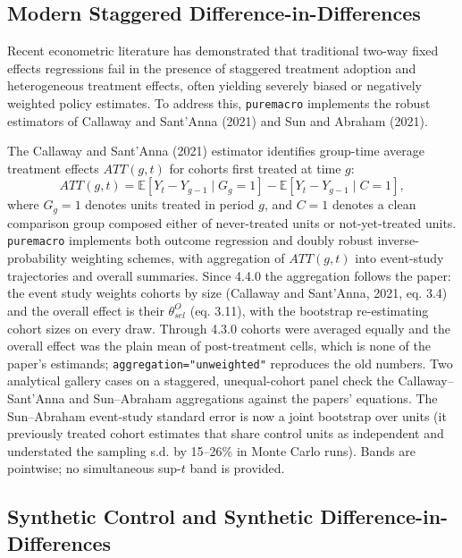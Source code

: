 \documentclass[11pt,letterpaper]{article}
\newcounter{none} %
\renewcommand{\_}{\pmunderscore\allowbreak}
\begin{document}
\subsection{Modern Staggered Difference-in-Differences}\label{modern-staggered-difference-in-differences}

Recent econometric literature has demonstrated that traditional two-way fixed effects regressions fail in the presence of staggered treatment adoption and heterogeneous treatment effects, often yielding severely biased or negatively weighted policy estimates. To address this, \texttt{puremacro} implements the robust estimators of Callaway and Sant'Anna (2021) and Sun and Abraham (2021).

The Callaway and Sant'Anna (2021) estimator identifies group-time average treatment effects \(ATT(g, t)\) for cohorts first treated at time \(g\):
\[ATT(g, t) = \mathbb{E}\left[ Y_t - Y_{g-1} \mid G_g = 1 \right] - \mathbb{E}\left[ Y_t - Y_{g-1} \mid C = 1 \right],\]
where \(G_g = 1\) denotes units treated in period \(g\), and \(C = 1\) denotes a clean comparison group composed either of never-treated units or not-yet-treated units. \texttt{puremacro} implements both outcome regression and doubly robust inverse-probability weighting schemes, with aggregation of \(ATT(g, t)\) into event-study trajectories and overall summaries. Since 4.4.0 the aggregation follows the paper: the event study weights cohorts by size (Callaway and Sant'Anna, 2021, eq. 3.4) and the overall effect is their \(\theta^O_{sel}\) (eq. 3.11), with the bootstrap re-estimating cohort sizes on every draw. Through 4.3.0 cohorts were averaged equally and the overall effect was the plain mean of post-treatment cells, which is none of the paper's estimands; \texttt{aggregation="unweighted"} reproduces the old numbers. Two analytical gallery cases on a staggered, unequal-cohort panel check the Callaway--Sant'Anna and Sun--Abraham aggregations against the papers' equations. The Sun--Abraham event-study standard error is now a joint bootstrap over units (it previously treated cohort estimates that share control units as independent and understated the sampling s.d. by 15--26\% in Monte Carlo runs). Bands are pointwise; no simultaneous sup-\(t\) band is provided.

\subsection{Synthetic Control and Synthetic Difference-in-Differences}\label{synthetic-control-and-synthetic-difference-in-differences}
\end{document}
